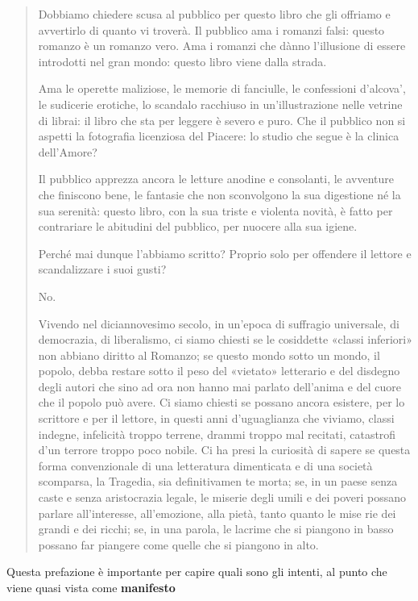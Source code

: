 \documentclass{book}
\begin{document}
\begin{quote}
Dobbiamo chiedere scusa al pubblico per questo libro che gli offriamo e avvertirlo di quanto vi troverà. Il pubblico ama i romanzi falsi: questo romanzo è un romanzo vero. Ama i romanzi che dànno l'illusione di essere introdotti nel gran mondo: questo libro viene dalla strada.

Ama le operette maliziose, le memorie di fanciulle, le confessioni d'alcova', le sudicerie erotiche, lo scandalo racchiuso in un'illustrazione nelle vetrine di librai: il libro che sta per leggere è severo e puro. Che il pubblico non si aspetti la fotografia licenziosa del Piacere: lo studio che segue è la clinica dell'Amore? 

Il pubblico apprezza ancora le letture anodine e consolanti, le avventure che finiscono bene, le fantasie che non sconvolgono la sua digestione né la sua serenità: questo libro, con la sua triste e violenta novità, è fatto per contrariare le abitudini del pubblico, per nuocere alla sua igiene.

Perché mai dunque l'abbiamo scritto? Proprio solo per offendere il lettore e scandalizzare i suoi gusti? 

No.

Vivendo nel diciannovesimo secolo, in un'epoca di suffragio universale, di democrazia, di liberalismo, ci siamo chiesti se le cosiddette «classi inferiori» non abbiano diritto al Romanzo; se questo mondo sotto un mondo, il popolo, debba restare sotto il peso del «vietato» letterario e del disdegno degli autori che sino ad ora non hanno mai parlato dell'anima e del cuore che il popolo può avere. Ci siamo chiesti se possano ancora esistere, per lo scrittore e per il lettore, in questi anni d'uguaglianza che viviamo, classi indegne, infelicità troppo terrene, drammi troppo mal recitati, catastrofi d'un terrore troppo poco nobile. Ci ha presi la curiosità di sapere se questa forma convenzionale di una letteratura dimenticata e di una società scomparsa, la Tragedia, sia definitivamen te morta; se, in un paese senza caste e senza aristocrazia legale, le miserie degli umili e dei poveri possano parlare all'interesse, all'emozione, alla pietà, tanto quanto le mise rie dei grandi e dei ricchi; se, in una parola, le lacrime che si piangono in basso possano far piangere come quelle che si piangono in alto.
\end{quote}

Questa prefazione è importante per capire quali sono gli intenti, al
punto che viene quasi vista come \textbf{manifesto}
\end{document}
